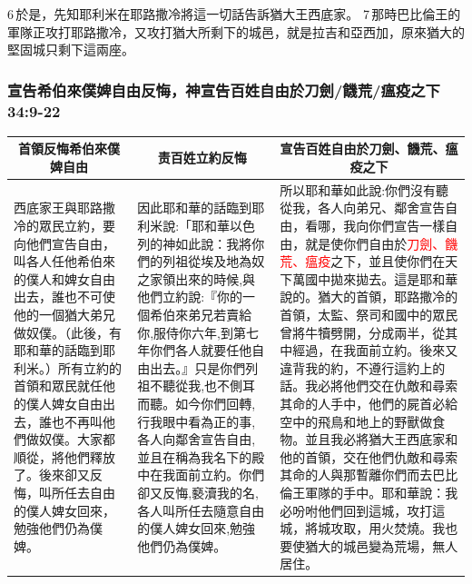 6 於是，先知耶利米在耶路撒冷將這一切話告訴猶大王西底家。 7 那時巴比倫王的軍隊正攻打耶路撒冷，又攻打猶大所剩下的城邑，就是拉吉和亞西加，原來猶大的堅固城只剩下這兩座。

\subsubsection{宣告希伯來僕婢自由反悔，神宣告百姓自由於刀劍/饑荒/瘟疫之下 34:9-22}
\begin{table}[H]
\centering
\begin{tabular}{p{3.75cm}|p{5.0cm}|p{7.70cm}}\hline\hline
\multicolumn{1}{c|}{首領反悔希伯來僕婢自由}&\multicolumn{1}{c|}{责百姓立約反悔}&\multicolumn{1}{c}{宣告百姓自由於刀劍、饑荒、瘟疫之下}\\\hline
\multirow{1}{3.95cm}{西底家王與耶路撒冷的眾民立約，要向他們宣告自由，叫各人任他希伯來的僕人和婢女自由出去，誰也不可使他的一個猶大弟兄做奴僕。（此後，有耶和華的話臨到耶利米。）所有立約的首領和眾民就任他的僕人婢女自由出去，誰也不再叫他們做奴僕。大家都順從，將他們釋放了。後來卻又反悔，叫所任去自由的僕人婢女回來，勉強他們仍為僕婢。}
&因此耶和華的話臨到耶利米說:「耶和華以色列的神如此說：我將你們的列祖從埃及地為奴之家領出來的時候,與他們立約說:『你的一個希伯來弟兄若賣給你,服侍你六年,到第七年你們各人就要任他自由出去。』只是你們列祖不聽從我,也不側耳而聽。如今你們回轉,行我眼中看為正的事,各人向鄰舍宣告自由,並且在稱為我名下的殿中在我面前立約。你們卻又反悔,褻瀆我的名,各人叫所任去隨意自由的僕人婢女回來,勉強他們仍為僕婢。
&所以耶和華如此說:你們沒有聽從我，各人向弟兄、鄰舍宣告自由，看哪，我向你們宣告一樣自由，就是使你們自由於\textcolor{red}{刀劍、饑荒、瘟疫}之下，並且使你們在天下萬國中拋來拋去。這是耶和華說的。猶大的首領，耶路撒冷的首領，太監、祭司和國中的眾民曾將牛犢劈開，分成兩半，從其中經過，在我面前立約。後來又違背我的約，不遵行這約上的話。我必將他們交在仇敵和尋索其命的人手中，他們的屍首必給空中的飛鳥和地上的野獸做食物。並且我必將猶大王西底家和他的首領，交在他們仇敵和尋索其命的人與那暫離你們而去巴比倫王軍隊的手中。耶和華說：我必吩咐他們回到這城，攻打這城，將城攻取，用火焚燒。我也要使猶大的城邑變為荒場，無人居住。\\\hline
\end{tabular}
\end{table}


